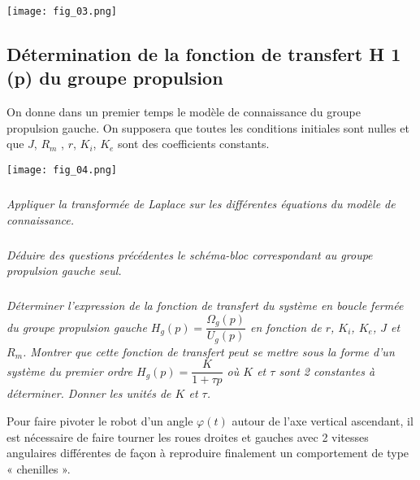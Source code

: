 \begin{multicols}{2}
\begin{center}
\texttt{[image: fig\_03.png]}
\end{center}
\fi


\subsection*{Détermination de la fonction de transfert H 1 (p) du groupe propulsion}

On donne dans un premier temps le modèle de connaissance du groupe propulsion gauche. On supposera que toutes les conditions initiales sont nulles et que  $J$,  $R_m$ , $r$, $K_i$, $K_e$ sont des coefficients constants.

\begin{center}
\texttt{[image: fig\_04.png]}
\end{center}

\subparagraph{}
\textit{Appliquer la transformée de Laplace sur les différentes équations du modèle de connaissance.}
\ifprof
\begin{corrige}
\end{corrige}
\else
\fi


\subparagraph{}
\textit{Déduire des questions précédentes le schéma-bloc correspondant au groupe propulsion gauche seul. }
\ifprof
\begin{corrige}
\end{corrige}
\else
\fi

\subparagraph{}
\textit{Déterminer l’expression de la fonction de transfert du système en boucle fermée du groupe propulsion gauche 
$H_g (p) =\dfrac{\Omega_g(p)}{U_g(p)}$ en fonction de $r$, $K_i$, $K_e$, $J$ et $R_m$. Montrer que cette fonction de
transfert peut se mettre sous la forme d’un système du premier ordre $H_g(p)=\dfrac{K}{1+\tau p}$  où $K$ et $\tau$ sont 2
constantes à déterminer. Donner les unités de $K$ et $\tau$. 
} 

\ifprof
\begin{corrige}
\end{corrige}
\else
\fi
Pour faire pivoter le robot d’un angle $\varphi(t)$ autour de l’axe vertical ascendant, il est nécessaire de faire tourner les roues droites et gauches avec 2 vitesses angulaires différentes de façon à reproduire finalement un comportement de type « chenilles ». 


\end{multicols}
